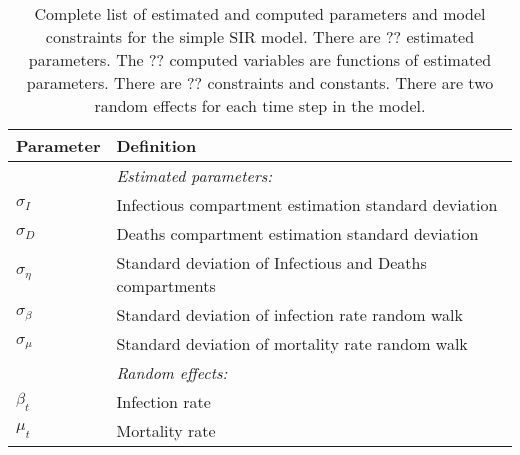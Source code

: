 \documentclass[12pt,letterpaper]{article}
\begin{document}
\begin{table}[b]
\caption{Complete list of estimated and computed parameters and model
constraints for the simple SIR model.
There are ?? estimated parameters. 
The ?? computed variables are functions of estimated parameters.
There are ?? constraints and constants.
There are two random effects for each time step in the model.
}
\label{tab:allvars1}
\begin{center}
\begin{tabular}{ll}
\hline
Parameter & Definition\\
\hline
\hline
       & {\it Estimated parameters:}\\
$\sigma_I$ & Infectious compartment estimation standard deviation\\
$\sigma_D$ & Deaths compartment estimation standard deviation\\
$\sigma_\eta$ & Standard deviation of Infectious and Deaths compartments\\
$\sigma_\beta$ & Standard deviation of infection rate random walk\\
$\sigma_\mu$ & Standard deviation of mortality rate random walk\\
       & {\it Random effects:}\\
$\beta_t$ & Infection rate\\
$\mu_t$ & Mortality rate\\
\hline
\end{tabular}
\end{center}
\end{table}
\end{document}
